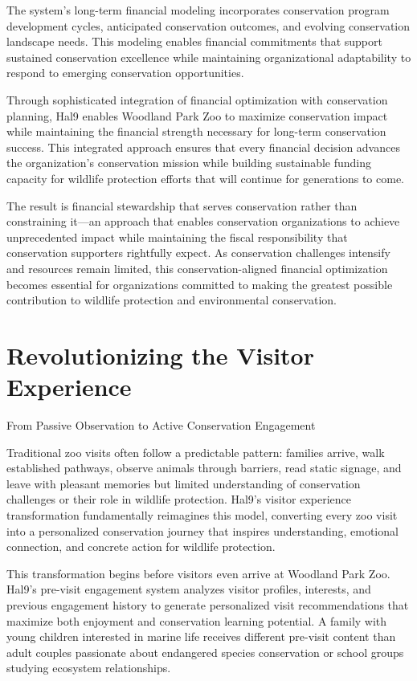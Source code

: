 \documentclass[
  Letterpaper,
]{scrbook}
\begin{document}
The system's long-term financial modeling incorporates conservation
program development cycles, anticipated conservation outcomes, and
evolving conservation landscape needs. This modeling enables financial
commitments that support sustained conservation excellence while
maintaining organizational adaptability to respond to emerging
conservation opportunities.

Through sophisticated integration of financial optimization with
conservation planning, Hal9 enables Woodland Park Zoo to maximize
conservation impact while maintaining the financial strength necessary
for long-term conservation success. This integrated approach ensures
that every financial decision advances the organization's conservation
mission while building sustainable funding capacity for wildlife
protection efforts that will continue for generations to come.

The result is financial stewardship that serves conservation rather than
constraining it---an approach that enables conservation organizations to
achieve unprecedented impact while maintaining the fiscal responsibility
that conservation supporters rightfully expect. As conservation
challenges intensify and resources remain limited, this
conservation-aligned financial optimization becomes essential for
organizations committed to making the greatest possible contribution to
wildlife protection and environmental conservation.


\chapter{Revolutionizing the Visitor
Experience}\label{revolutionizing-the-visitor-experience}

From Passive Observation to Active Conservation Engagement

\hfill\break

Traditional zoo visits often follow a predictable pattern: families
arrive, walk established pathways, observe animals through barriers,
read static signage, and leave with pleasant memories but limited
understanding of conservation challenges or their role in wildlife
protection. Hal9's visitor experience transformation fundamentally
reimagines this model, converting every zoo visit into a personalized
conservation journey that inspires understanding, emotional connection,
and concrete action for wildlife protection.

This transformation begins before visitors even arrive at Woodland Park
Zoo. Hal9's pre-visit engagement system analyzes visitor profiles,
interests, and previous engagement history to generate personalized
visit recommendations that maximize both enjoyment and conservation
learning potential. A family with young children interested in marine
life receives different pre-visit content than adult couples passionate
about endangered species conservation or school groups studying
ecosystem relationships.
\end{document}
